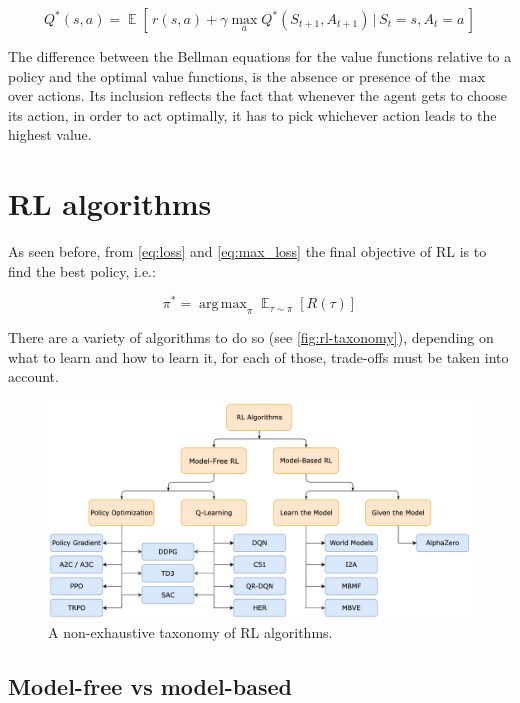 \documentclass{article}
\DeclareMathOperator*{\E}{\mathbb{E}}
\DeclareMathOperator*{\argmax}{arg\,max}
\begin{document}
\begin{equation}
	Q^{*}(s,a) = \E[\, {r(s,a) + \gamma \max_a {Q^{*}(S_{t+1}, A_{t+1})} \,|\, S_t = s, A_t = a} \,]
\end{equation}

The difference between the Bellman equations for the value functions relative to a policy and the optimal value functions, is the absence or presence of the $\max$ over actions. Its inclusion reflects the fact that whenever the agent gets to choose its action, in order to act optimally, it has to pick whichever action leads to the highest value.

\section{RL algorithms}
As seen before, from \autoref{eq:loss} and \autoref{eq:max_loss} the final objective of RL is to find the best policy, i.e.:

\begin{equation}
	\pi^* = \argmax_\pi \E_{\tau \sim \pi}{[R(\tau)]}
	\label{eq:objective}
\end{equation}

There are a variety of algorithms to do so (see \autoref{fig:rl-taxonomy}), depending on what to learn and how to learn it, for each of those, trade-offs must be taken into account.

\begin{figure}[h]
	\centering
	\includegraphics[width=13cm]{rl-taxonomy.png}
	\caption{A non-exhaustive taxonomy of RL algorithms. \cite{SpinningUp2018}}
	\label{fig:rl-taxonomy}
\end{figure}


\subsection{Model-free vs model-based}
\end{document}
